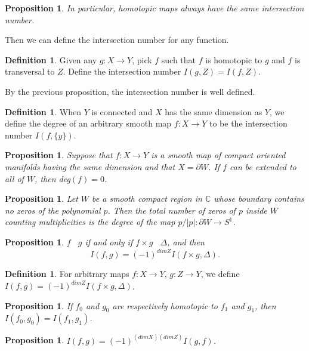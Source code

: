 \documentclass[psamsfonts]{amsart}
\newtheorem{prop}[theorem]{Proposition}
\theoremstyle{definition}
\newtheorem{defn}[theorem]{Definition}
\theoremstyle{remark}
\numberwithin{equation}{section}
\begin{document}
		\begin{prop}
			In particular, homotopic maps always have the same intersection number.
		\end{prop}
		Then we can define the intersection number for any function.
		\begin{defn}
			Given any $g: X \to Y$, pick $f$ such that $f$ is homotopic to $g$ and $f$ is transversal to $Z$. Define the intersection number $I(g,Z) = I(f,Z)$.
		\end{defn}			 
		By the previous proposition, the intersection number is well defined.
		\begin{defn}
			When $Y$ is connected and $X$ has the same dimension as $Y$, we define the degree of an arbitrary smooth map $f:X \to Y$ to be the intersection number $I(f,\{y\})$.
		\end{defn}
		\begin{prop}
			Suppose that $f:X \to Y$ is a smooth map of compact oriented manifolds having the same dimension and that $X = \partial W$. If $f$ can be extended to all of $W$, then deg$(f)=0$.
		\end{prop}
		\begin{prop}
			Let $W$ be a smooth compact region in $\mathbb{C}$ whose boundary contains no zeros of the polynomial $p$. Then the total number of zeros of $p$ inside $W$ counting multiplicities is the degree of the map $p/|p|: \partial W \to S^1$.
		\end{prop}
		\begin{prop}
			$f$ \;\;\makebox[0pt]{$\top$}\makebox[0pt]{$\cap$}\;\ $g$ if and only if $f\times g$ \;\;\makebox[0pt]{$\top$}\makebox[0pt]{$\cap$}\;\ $\Delta$, and then
			\begin{equation}
				I(f,g) = (-1)^{dim Z}I(f\times g, \Delta).
			\end{equation}
		\end{prop}
		\begin{defn}
			For arbitrary maps $f: X \to Y$, $g: Z \to Y$, we define $I(f,g) = (-1)^{dimZ}I(f\times g, \Delta)$.
		\end{defn}
		\begin{prop}
			If $f_0$ and $g_0$ are respectively homotopic to $f_1$ and $g_1$, then $I(f_0,g_0)= I(f_1,g_1)$.
		\end{prop}
		\begin{prop}
			$I(f,g)=(-1)^{(dim X)(dim Z)}I(g,f)$.
		\end{prop}
		
\end{document}

